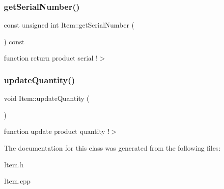 \subsubsection{\texorpdfstring{get\+Serial\+Number()}{getSerialNumber()}}
{\footnotesize\ttfamily const unsigned int Item\+::get\+Serial\+Number (\begin{DoxyParamCaption}{ }\end{DoxyParamCaption}) const}

function return product serial !$>$ \mbox{\label{class_item_ae54aa11885082b7f5e37a925dace0c65}} 
\subsubsection{\texorpdfstring{update\+Quantity()}{updateQuantity()}}
{\footnotesize\ttfamily void Item\+::update\+Quantity (\begin{DoxyParamCaption}{ }\end{DoxyParamCaption})}

function update product quantity !$>$ 

The documentation for this class was generated from the following files\+:\begin{DoxyCompactItemize}
\item 
Item.\+h\item 
Item.\+cpp\end{DoxyCompactItemize}
